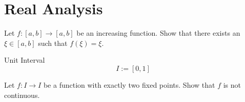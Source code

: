 \section{Real Analysis}
\begin{boxProblem}{}
    Let \( f : [a,b] \to [a,b] \) be an increasing function.
    Show that there exists an \( \xi \in [a,b] \) such that \( f(\xi) = \xi \).
\end{boxProblem}
\begin{boxProblem}{}
\begin{boxDefinition}{Unit Interval}
    \[ I := [0,1] \]
\end{boxDefinition}
    Let \( f : I \to I \) be a function with exactly two fixed points.
    Show that \( f \) is not continuous.
\end{boxProblem}
